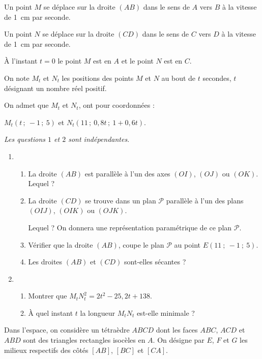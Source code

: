 \begin{colonne*exercice}
\begin{exercice}
  Un point $M$ se déplace sur la droite $(AB)$ dans le sens de $A$ vers $B$
  à la vitesse de 1~cm par seconde.

  Un point $N$ se déplace sur la droite $(CD)$ dans le sens de $C$ vers $D$
  à la vitesse de 1~cm par seconde.

  À l'instant $t = 0$ le point $M$ est en $A$ et le point $N$ est en $C$.

  On note $M_t$ et $N_t$ les positions des points $M$ et $N$ au bout
  de $t$ secondes, $t$ désignant un nombre réel positif.

  On admet que $M_t$ et $N_t$, ont pour coordonnées :

  $M_t(t\,;\ -1\,;\ 5)$ et $N_t(11\,;\ 0,8t\,;\ 1 + 0,6 t)$.

  \emph{Les questions $1$ et $2$ sont indépendantes.}

\begin{enumerate}
\item
  \begin{enumerate}
  \item La droite $(AB)$ est parallèle à l'un des axes $(OI)$, $(OJ)$ ou
    $(OK)$. Lequel ?
  \item La droite $(CD)$ se trouve dans un plan $\mathcal{P}$ parallèle
    à l'un des plans $(OIJ)$, $(OIK)$ ou $(OJK)$.
		
    Lequel ? On donnera une représentation paramétrique de ce plan
    $\mathcal{P}$.
  \item Vérifier que la droite $(AB)$, coupe le plan $\mathcal{P}$ au
    point $E(11~;~-1~;~5)$.
  \item Les droites $(AB)$ et $(CD)$ sont-elles sécantes ?
  \end{enumerate}
\item
  \begin{enumerate}
  \item Montrer que $M_t^{}N_t ^2 = 2 t^2 - 25,2 t + 138$.
  \item À quel instant $t$ la longueur $M_tN_t$ est-elle minimale ?
  \end{enumerate}
\end{enumerate}
\end{exercice}

\begin{exercice}
  Dans l'espace, on considère un tétraèdre $ABCD$ dont les faces
  $ABC$, $ACD$ et $ABD$ sont des triangles rectangles isocèles en
  $A$. On désigne par $E$, $F$ et $G$ les milieux respectifs des côtés
  $[AB]$, $[BC]$ et $[CA]$.


\end{exercice}
\end{colonne*exercice}
